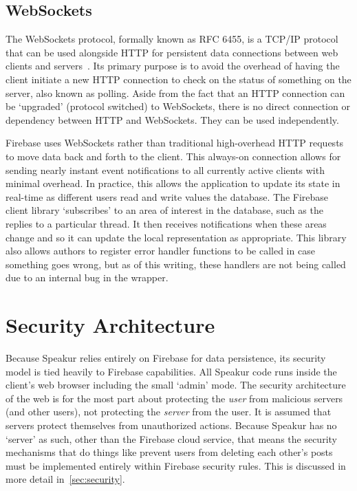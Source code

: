 \subsection{WebSockets}
\label{sec:websockets}
The WebSockets protocol, formally known as RFC 6455, 
is a TCP/IP protocol that can be used alongside HTTP for persistent data connections between web clients and servers~\cite{mozillacontributors2015-a}.
Its primary purpose is to avoid the overhead of having the client initiate a new HTTP connection to check on the status of something on the server, also known as polling.
Aside from the fact that an HTTP connection can be `upgraded' (protocol switched) to WebSockets,
there is no direct connection or dependency between HTTP and WebSockets.
They can be used independently.

Firebase uses WebSockets rather than traditional high-overhead HTTP requests to move data back and forth to the client.
This always-on connection allows for sending nearly instant event notifications to all currently active clients with minimal overhead.
In practice, this allows the application to update its state in real-time as different users read and write values the database.
The Firebase client library `subscribes' to an area of interest in the database, such as the replies to a particular thread.
It then receives notifications when these areas change and so it can update the local representation as appropriate.
This library also allows authors to register error handler functions to be called in case something goes wrong, but as of this writing, these handlers are not being called due to an internal bug in the  wrapper.

\section{Security Architecture}
\label{sec:arch_security}
Because Speakur relies entirely on Firebase for data persistence, its security model is tied heavily to Firebase capabilities. 
All Speakur code runs inside the client's web browser including the small `admin' mode.
The security architecture of the web is for the most part about protecting the \textit{user} from malicious servers (and other users), not protecting the \textit{server} from the user.
It is assumed that servers protect themselves from unauthorized actions.
Because Speakur has no `server' as such, 
other than the Firebase cloud service,
that means the security mechanisms that do things like prevent users from deleting each other's posts 
must be implemented entirely within Firebase security rules.
This is discussed in more detail in~\cref{sec:security}.

